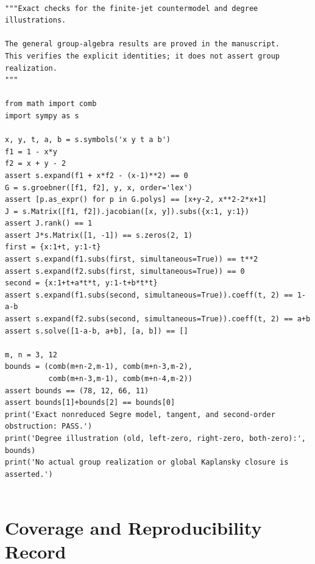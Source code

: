 \documentclass[11pt,a4paper,oneside]{report}
\theoremstyle{definition}
\theoremstyle{remark}
\begin{document}
\begin{lstlisting}

"""Exact checks for the finite-jet countermodel and degree illustrations.

The general group-algebra results are proved in the manuscript.
This verifies the explicit identities; it does not assert group realization.
"""

from math import comb
import sympy as s

x, y, t, a, b = s.symbols('x y t a b')
f1 = 1 - x*y
f2 = x + y - 2
assert s.expand(f1 + x*f2 - (x-1)**2) == 0
G = s.groebner([f1, f2], y, x, order='lex')
assert [p.as_expr() for p in G.polys] == [x+y-2, x**2-2*x+1]
J = s.Matrix([f1, f2]).jacobian([x, y]).subs({x:1, y:1})
assert J.rank() == 1
assert J*s.Matrix([1, -1]) == s.zeros(2, 1)
first = {x:1+t, y:1-t}
assert s.expand(f1.subs(first, simultaneous=True)) == t**2
assert s.expand(f2.subs(first, simultaneous=True)) == 0
second = {x:1+t+a*t*t, y:1-t+b*t*t}
assert s.expand(f1.subs(second, simultaneous=True)).coeff(t, 2) == 1-a-b
assert s.expand(f2.subs(second, simultaneous=True)).coeff(t, 2) == a+b
assert s.solve([1-a-b, a+b], [a, b]) == []

m, n = 3, 12
bounds = (comb(m+n-2,m-1), comb(m+n-3,m-2),
          comb(m+n-3,m-1), comb(m+n-4,m-2))
assert bounds == (78, 12, 66, 11)
assert bounds[1]+bounds[2] == bounds[0]
print('Exact nonreduced Segre model, tangent, and second-order obstruction: PASS.')
print('Degree illustration (old, left-zero, right-zero, both-zero):', bounds)
print('No actual group realization or global Kaplansky closure is asserted.')


\end{lstlisting}


\clearpage

\chapter{Coverage and Reproducibility Record}\label{chap:coverage}
\end{document}
